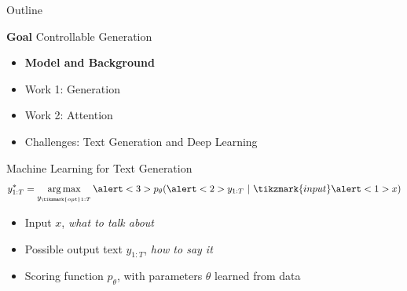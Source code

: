 
\begin{frame}{Outline}
  \begin{center}
    \textbf{Goal}
    Controllable Generation
  \end{center}
  \pause
  \air

  \begin{itemize}
  \item \textbf{Model and Background}
    \air
  \item Work 1: Generation
    \air

  \item Work 2: Attention
    \air

  \item Challenges: Text Generation and Deep Learning
  \end{itemize}
\end{frame}


\begin{frame}{Machine Learning for Text Generation}
  \[ y^*_{1:T} = \argmax_{y_{\tikzmark{opt}1:T}} \alert<3>{p}_{\theta}(\alert<2>{y_{1:T}} \ | \ \tikzmark{input}\alert<1>{x}) \]



  \begin{itemize}
  \item Input \alert<1>{$x$},  \textit{what to talk about}
    \air
    \pause
  \item Possible output text \alert<2>{$y_{1:T}$}, \textit{how to say it}
    \air
    \pause
  \item Scoring function \alert<3>{$p_{\theta}$}, with parameters $\theta$ learned from data
  \end{itemize}

\end{frame}


